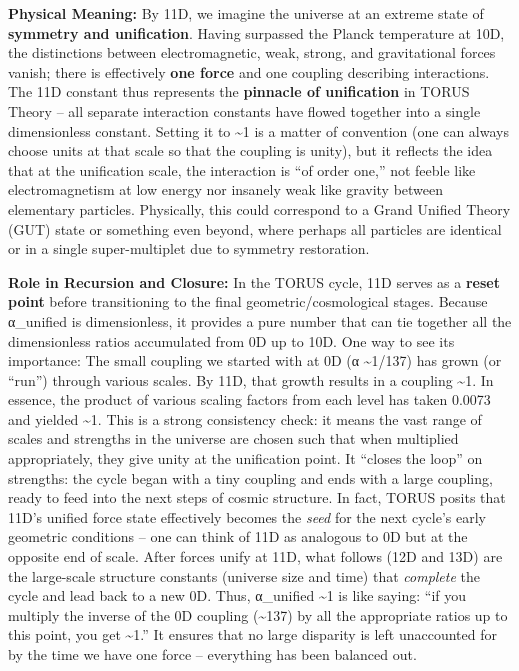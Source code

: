 \textbf{Physical Meaning:} By 11D, we imagine the universe at an extreme
state of \textbf{symmetry and unification}. Having surpassed the Planck
temperature at 10D, the distinctions between electromagnetic, weak,
strong, and gravitational forces vanish; there is effectively
\textbf{one force} and one coupling describing interactions​. The 11D
constant thus represents the \textbf{pinnacle of unification} in TORUS
Theory -- all separate interaction constants have flowed together into a
single dimensionless constant. Setting it to \textasciitilde{}1 is a
matter of convention (one can always choose units at that scale so that
the coupling is unity), but it reflects the idea that at the unification
scale, the interaction is ``of order one,'' not feeble like
electromagnetism at low energy nor insanely weak like gravity between
elementary particles. Physically, this could correspond to a Grand
Unified Theory (GUT) state or something even beyond, where perhaps all
particles are identical or in a single super-multiplet due to symmetry
restoration​.

\textbf{Role in Recursion and Closure:} In the TORUS cycle, 11D serves
as a \textbf{reset point} before transitioning to the final
geometric/cosmological stages. Because α\_unified is dimensionless, it
provides a pure number that can tie together all the dimensionless
ratios accumulated from 0D up to 10D. One way to see its importance: The
small coupling we started with at 0D (α \textasciitilde{}1/137) has
grown (or ``run'') through various scales. By 11D, that growth results
in a coupling \textasciitilde{}1. In essence, the product of various
scaling factors from each level has taken 0.0073 and yielded
\textasciitilde{}1​. This is a strong consistency check: it means the
vast range of scales and strengths in the universe are chosen such that
when multiplied appropriately, they give unity at the unification point.
It ``closes the loop'' on strengths: the cycle began with a tiny
coupling and ends with a large coupling, ready to feed into the next
steps of cosmic structure​. In fact, TORUS posits that 11D's unified
force state effectively becomes the \emph{seed} for the next cycle's
early geometric conditions -- one can think of 11D as analogous to 0D
but at the opposite end of scale​. After forces unify at 11D, what
follows (12D and 13D) are the large-scale structure constants (universe
size and time) that \emph{complete} the cycle and lead back to a new 0D.
Thus, α\_unified \textasciitilde{}1 is like saying: ``if you multiply
the inverse of the 0D coupling (\textasciitilde{}137) by all the
appropriate ratios up to this point, you get \textasciitilde{}1.'' It
ensures that no large disparity is left unaccounted for by the time we
have one force -- everything has been balanced out.

